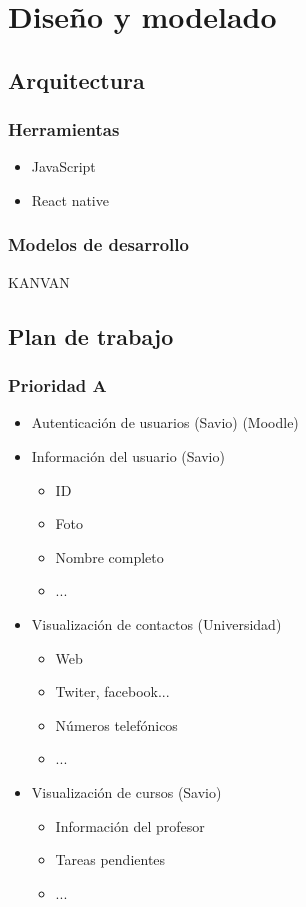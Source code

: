 \chapter{Diseño y modelado}

\section{Arquitectura}
    \subsection{Herramientas}
        \begin{itemize}
             \item JavaScript
             \item React native
        \end{itemize}
     \subsection{Modelos de desarrollo}
         KANVAN

\section{Plan de trabajo}

\subsection{Prioridad A}
\begin{itemize}
 \item Autenticación de usuarios (Savio) (Moodle)
 \item Información del usuario (Savio)
    \begin{itemize}
         \item ID
         \item Foto
         \item Nombre completo
         \item ...
    \end{itemize}
 \item Visualización de contactos (Universidad)
  \begin{itemize}
         \item Web
         \item Twiter, facebook...
         \item Números telefónicos
         \item ...
    \end{itemize}
 \item Visualización de cursos (Savio)
   \begin{itemize}
         \item Información del profesor
         \item Tareas pendientes
         \item ...
    \end{itemize}
\end{itemize}


